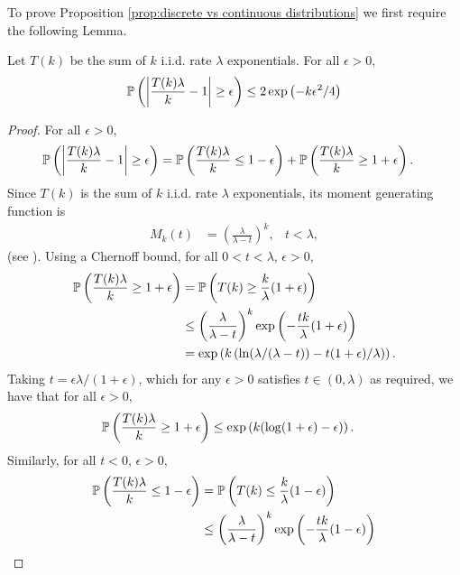 	To prove Proposition \ref{prop:discrete vs continuous distributions} we first require the following Lemma.
	\begin{lemma}
		\label{lem:T(k) bound}
		Let $T(k)$ be the sum of $k$ i.i.d. rate $\lambda$ exponentials. For all $\epsilon > 0$,
		\begin{equation}
			\mathbb{P}\left(\left|\frac{T(k) \lambda}{k} - 1\right| \geq \epsilon \right) \leq 2 \exp\left(-k \epsilon^2 /4\right)
		\end{equation}
	\end{lemma}
	\begin{proof}
	For all $\epsilon > 0$,
		\begin{align}
			\mathbb{P}\left(\left|\frac{T(k) \lambda}{k} - 1\right| \geq \epsilon \right) &= \mathbb{P}\left(\frac{T(k) \lambda}{k} \leq 1 - \epsilon \right) + \mathbb{P}\left(\frac{T(k) \lambda}{k} \geq 1 + \epsilon \right).
		\end{align}
		Since $T(k)$ is the sum of $k$ i.i.d. rate $\lambda$ exponentials, its moment generating function is 
		\begin{align}
			M_k(t) &= \left(\frac{\lambda}{\lambda - t}\right)^k, &t < \lambda,
		\end{align}
		(see \cite[Example 21.3]{Billingsley1995-en}).
		Using a Chernoff bound, for all $0 <t < \lambda$, $\epsilon > 0$,
		\begin{align}
			\mathbb{P}\left(\frac{T(k) \lambda}{k} \geq 1  + \epsilon\right) &= \mathbb{P}\left(T(k) \geq \frac{k}{\lambda}(1  + \epsilon)\right)\\
			&\leq \left(\frac{\lambda}{\lambda - t}\right)^k \exp\left(-\frac{t k}{\lambda}(1  + \epsilon)\right)\\
			&= \exp\left(k\left(\ln(\lambda/(\lambda - t)) - t(1 + \epsilon)/\lambda\right)\right).
		\end{align}
		Taking $t = \epsilon\lambda/(1+\epsilon)$, which for any $\epsilon > 0$ satisfies $t \in (0, \lambda)$ as required, we have that for all $\epsilon > 0$,
		\begin{align}
			\mathbb{P}\left(\frac{T(k) \lambda}{k} \geq 1  + \epsilon\right) &\leq \exp\left(k(\log(1 + \epsilon) - \epsilon)\right).
		\end{align}
		Similarly, for all $t < 0$, $\epsilon > 0$,
		\begin{align}
			\prob\left(\frac{T(k) \lambda}{k} \leq 1 - \epsilon \right) &= \prob\left(T(k) \leq \frac{k}{\lambda}(1  - \epsilon)\right)\\
			&\leq \left(\frac{\lambda}{\lambda - t}\right)^k \exp\left(-\frac{t k}{\lambda}(1  - \epsilon)\right)\\

\end{align}
\end{proof}
